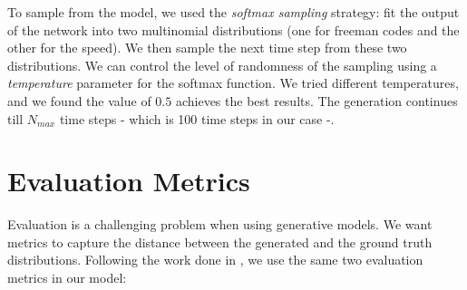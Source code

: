 \documentclass[conference]{IEEEtran}
\begin{document}
\par To sample from the model, we used the \textit{softmax sampling} strategy: fit the output of the network into two multinomial distributions (one for freeman codes and the other for the speed). We then sample the next time step from these two distributions. We can control the level of randomness of the sampling using a \textit{temperature} parameter for the softmax function. We tried different temperatures, and we found the value of $0.5$ achieves the best results. The generation continues till $N_{max}$ time steps - which is 100 time steps in our case -.

\section{Evaluation Metrics} \label{sec:evaluation}
\par Evaluation is a challenging problem when using generative models. We want metrics to capture the distance between the generated and the ground truth distributions. Following the work done in \cite{mohammed2018DTL}, we use the same two evaluation metrics in our model:
\end{document}
